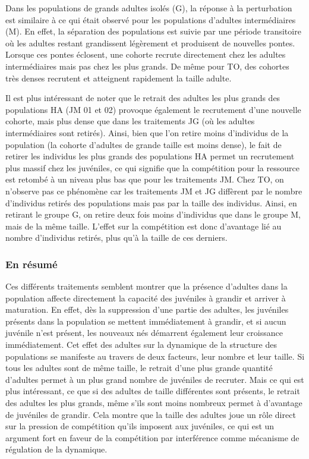 Dans les populations de grands adultes isolés (G), la réponse à la perturbation
est similaire à ce qui était observé pour les populations d'adultes
intermédiaires (M). En effet, la séparation des populations est suivie par une
période transitoire où les adultes restant grandissent légèrement et produisent
de nouvelles pontes. Lorsque ces pontes éclosent, une cohorte recrute
directement chez les adultes intermédiaires mais pas chez les plus grands. De
même pour TO, des cohortes très denses recrutent et atteignent rapidement la
taille adulte. 

Il est plus intéressant de noter que le retrait des adultes les plus grands des
populations HA  (JM 01 et 02) provoque également le recrutement d'une nouvelle
cohorte, mais plus dense que dans les traitements JG (où les adultes
intermédiaires sont retirés). Ainsi, bien que l'on retire moins d'individus
de la population (la cohorte d'adultes de grande taille est moins dense), le
fait de retirer les individus les plus grands des populations HA permet un
recrutement plus massif chez les juvéniles, ce qui signifie que la compétition
pour la ressource est retombé à un niveau plus bas que pour les traitements JM.
Chez TO, on n'observe pas ce phénomène car les traitements JM et JG diffèrent
par le nombre d'individus retirés des populations mais pas par la taille des
individus. Ainsi, en retirant le groupe G, on retire deux fois moins d'individus
que dans le groupe M, mais de la même taille. L'effet sur la compétition est
donc d'avantage lié au nombre d'individus retirés, plus qu'à la taille de ces
derniers. 

\subsubsection{En résumé}

Ces différents traitements semblent montrer que la présence d'adultes dans la
population affecte directement la capacité des juvéniles à grandir et arriver
à maturation. En effet, dès la suppression d'une partie des adultes, les
juvéniles présents dans la population se mettent immédiatement à grandir, et si
aucun juvénile n'est présent, les nouveaux nés démarrent également leur
croissance immédiatement. Cet effet des adultes sur la dynamique de la structure
des populations se manifeste au travers de deux facteurs, leur nombre et leur
taille. Si tous les adultes sont de même taille, le retrait d'une plus grande
quantité d'adultes permet à un plus grand nombre de juvéniles de recruter. Mais
ce qui est plus intéressant, ce que si des adultes de taille différentes sont
présents, le retrait des adultes les plus grands, même s'ils sont moins nombreux
permet à d'avantage de juvéniles de grandir. Cela montre que la taille des
adultes joue un rôle direct sur la pression de compétition qu'ils imposent aux
juvéniles, ce qui est un argument fort en faveur de la compétition par
interférence comme mécanisme de régulation de la dynamique. 

